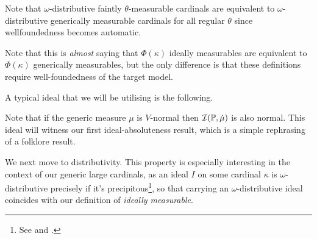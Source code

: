\documentclass[../../main]{subfiles}
\begin{document}
Note that $\omega$-distributive faintly $\theta$-measurable cardinals are equivalent to $\omega$-distributive generically measurable cardinals for all regular $\theta$ since wellfoundedness becomes automatic.


Note that this is \textit{almost} saying that $\Phi(\kappa)$ ideally measurables are equivalent to $\Phi(\kappa)$ generically measurables, but the only difference is that these definitions require well-foundedness of the target model.

\qquad A typical ideal that we will be utilising is the following.


Note that if the generic measure $\mu$ is $V$-normal then $\operatorname{\mathcal I}(\mathbb P,\dot\mu)$ is also normal. This ideal will witness our first ideal-absoluteness result, which is a simple rephrasing of a folklore result.


We next move to distributivity. This property is especially interesting in the context of our generic large cardinals, as an ideal $I$ on some cardinal $\kappa$ is $\omega$-distributive precisely if it's precipitous\footnote{See \cite{Precipitous} and \cite{Foreman}.}, so that carrying an $\omega$-distributive ideal coincides with our definition of \textit{ideally measurable}.
\end{document}

